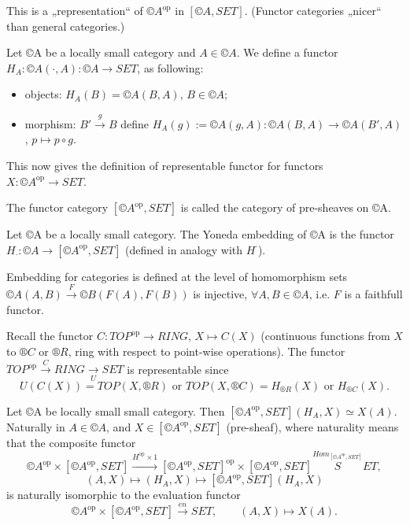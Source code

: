 \documentclass[12pt]{article}					%
\newcommand{\op}{^{\text{op}}}
\begin{document}
\begin{poznamka}[Moral]
	This is a „representation“ of $©A\op$ in $[©A, SET]$. (Functor categories „nicer“ than general categories.)
\end{poznamka}

\begin{definice}
	Let ©A be a locally small category and $A \in ©A$. We define a functor $H_A: ©A(·, A): ©A \rightarrow SET$, as following:
	\begin{itemize}
		\item objects: $H_A(B) = ©A(B, A)$, $B \in ©A$;
		\item morphism: $B' \overset{g}\rightarrow B$ define $H_A(g) := ©A(g, A): ©A(B, A) \rightarrow ©A(B', A)$, $p \mapsto p∘g$.
	\end{itemize}
\end{definice}

\begin{poznamka}
	This now gives the definition of representable functor for functors $X: ©A\op \rightarrow SET$.
\end{poznamka}

\begin{definice}[Recall]
	The functor category $[©A\op, SET]$ is called the category of pre-sheaves on ©A.
\end{definice}

\begin{definice}
	Let ©A be a locally small category. The Yoneda embedding of ©A is the functor $H_·: ©A \rightarrow [©A\op, SET]$ (defined in analogy with $H^·$).

	\begin{poznamkain}
		Embedding for categories is defined at the level of homomorphism sets $©A(A, B) \overset{F}\rightarrow ©B(F(A), F(B))$ is injective, $\forall A, B \in ©A$, i.e. $F$ is a faithfull functor.
	\end{poznamkain}
\end{definice}

\begin{priklady}
	Recall the functor $C: TOP\op \rightarrow RING$, $X \mapsto C(X)$ (continuous functions from $X$ to $®C$ or $®R$, ring with respect to point-wise operations). The functor $TOP\op \overset{C}\rightarrow RING \underset{U}\rightarrow SET$ is representable since
	$$ U(C(X)) = TOP(X, ®R) \text{ or } TOP(X, ®C) = H_{®R}(X) \text{ or } H_{®C}(X). $$
\end{priklady}

\begin{veta}
	Let ©A be locally small small category. Then $[©A\op, SET](H_A, X) \simeq X(A)$. Naturally in $A \in ©A$, and $X \in [©A\op, SET]$ (pre-sheaf), where naturality means that the composite functor
	$$ ©A\op \times [©A\op, SET] \overset{H_·\op \times 1}\rightarrow [©A\op, SET]\op \times [©A\op, SET] \overset{Hom_{[©A\op, SET]}} SET, $$
	$$ (A, X) \mapsto (H_A, X) \mapsto [©A\op, SET](H_A, X) $$
	is naturally isomorphic to the evaluation functor
	$$ ©A\op \times [©A\op, SET] \overset{en}\rightarrow SET, \qquad (A, X) \mapsto X(A). $$
\end{veta}
\end{document}
